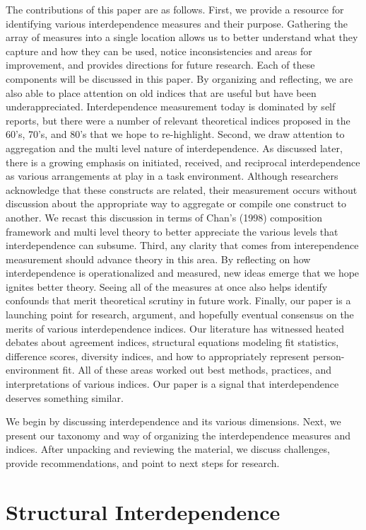\documentclass[english,,man]{apa6}
\theoremstyle{definition}
\theoremstyle{definition}
\theoremstyle{definition}
\theoremstyle{remark}
\begin{document}
The contributions of this paper are as follows. First, we provide a
resource for identifying various interdependence measures and their
purpose. Gathering the array of measures into a single location allows
us to better understand what they capture and how they can be used,
notice inconsistencies and areas for improvement, and provides
directions for future research. Each of these components will be
discussed in this paper. By organizing and reflecting, we are also able
to place attention on old indices that are useful but have been
underappreciated. Interdependence measurement today is dominated by self
reports, but there were a number of relevant theoretical indices
proposed in the 60's, 70's, and 80's that we hope to re-highlight.
Second, we draw attention to aggregation and the multi level nature of
interdependence. As discussed later, there is a growing emphasis on
initiated, received, and reciprocal interdependence as various
arrangements at play in a task environment. Although researchers
acknowledge that these constructs are related, their measurement occurs
without discussion about the appropriate way to aggregate or compile one
construct to another. We recast this discussion in terms of Chan's
(1998) composition framework and multi level theory to better appreciate
the various levels that interdependence can subsume. Third, any clarity
that comes from interependence measurement should advance theory in this
area. By reflecting on how interdependence is operationalized and
measured, new ideas emerge that we hope ignites better theory. Seeing
all of the measures at once also helps identify confounds that merit
theoretical scrutiny in future work. Finally, our paper is a launching
point for research, argument, and hopefully eventual consensus on the
merits of various interdependence indices. Our literature has witnessed
heated debates about agreement indices, structural equations modeling
fit statistics, difference scores, diversity indices, and how to
appropriately represent person-environment fit. All of these areas
worked out best methods, practices, and interpretations of various
indices. Our paper is a signal that interdependence deserves something
similar.

We begin by discussing interdependence and its various dimensions. Next,
we present our taxonomy and way of organizing the interdependence
measures and indices. After unpacking and reviewing the material, we
discuss challenges, provide recommendations, and point to next steps for
research.

\hypertarget{structural-interdependence}{%
\section{Structural Interdependence}\label{structural-interdependence}}
\end{document}
